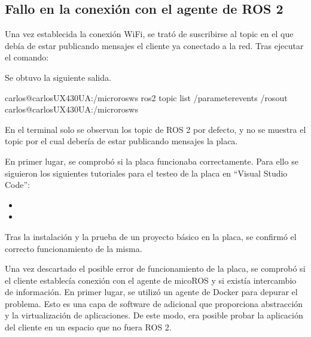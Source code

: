 \documentclass[a4paper,11pt,spanish]{sphinxmanual}
\begin{document}
\subsection{Fallo en la conexión con el agente de ROS 2}
\label{\detokenize{Anexos:fallo-en-la-conexion-con-el-agente-de-ros-2}}
\sphinxAtStartPar
Una vez establecida la conexión Wi\sphinxhyphen{}Fi, se trató de suscribirse al
topic en el que debía de estar publicando mensajes el cliente ya
conectado a la red. Tras ejecutar el comando:

\begin{sphinxVerbatim}[commandchars=\\\{\},formatcom=\footnotesize]
  
\end{sphinxVerbatim}

\sphinxAtStartPar
Se obtuvo la siguiente salida.

\begin{sphinxVerbatim}[commandchars=\\\{\},formatcom=\footnotesize]
carlos@carlos\PYGZhy{}UX430UA:\PYGZti{}/microros\PYGZus{}ws\PYGZdl{} ros2 topic list
/parameter\PYGZus{}events
/rosout
carlos@carlos\PYGZhy{}UX430UA:\PYGZti{}/microros\PYGZus{}ws\PYGZdl{}
\end{sphinxVerbatim}

\sphinxAtStartPar
En el terminal solo se observan los topic de ROS 2 por defecto,
y no se muestra el topic por el cual debería de estar publicando
mensajes la placa.

\sphinxAtStartPar
En primer lugar, se comprobó si la placa funcionaba correctamente.
Para ello se siguieron los  siguientes tutoriales para el testeo de
la placa en “Visual Studio Code”:
\begin{itemize}
\item {} 
\sphinxAtStartPar
{}

\item {} 
\sphinxAtStartPar
{}

\end{itemize}

\sphinxAtStartPar
Tras la instalación y la prueba de un proyecto básico en la placa,
se confirmó el correcto funcionamiento de la misma.

\sphinxAtStartPar
Una vez descartado el posible error de funcionamiento de la placa,
se comprobó si el cliente establecía conexión  con el agente de mico\sphinxhyphen{}ROS
y si existía intercambio de información. En primer lugar, se utilizó un
agente de Docker para depurar el problema. Esto es una capa de software
de adicional que proporciona abstracción y la virtualización de
aplicaciones. De este modo, era posible probar la aplicación del cliente
en un espacio que no fuera ROS 2.
\end{document}

